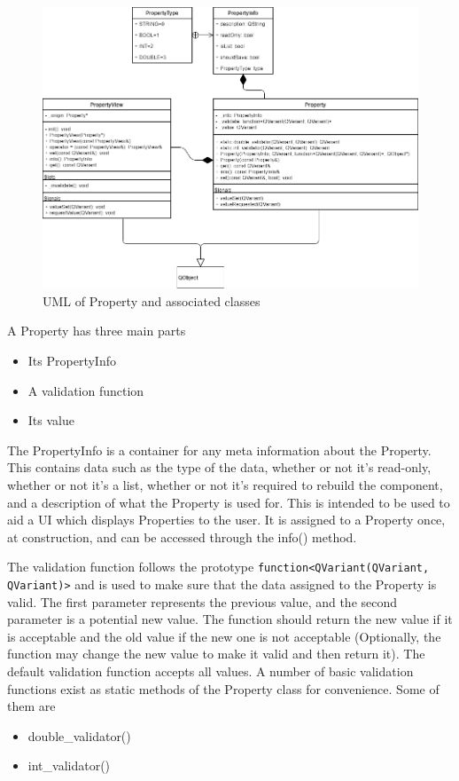  \begin{figure}[h!]
 	\begin{center}
 	\includegraphics[width=\textwidth]{./images_design/uml/Property}
 	\caption{UML of Property and associated classes\label{uml:property}}
 	\end{center}
 \end{figure} 
 
 	A Property has three main parts
 	\begin{itemize}
 		\item Its PropertyInfo
 		\item A validation function
 		\item Its value
 	\end{itemize}
 	
 	The PropertyInfo is a container for any meta information about the Property. This contains data such as the type of the data, whether or not it's read-only, whether or not it's a list, whether or not it's required to rebuild the component, and a description of what the Property is used for. This is intended to be used to aid a UI which displays Properties to the user. It is assigned to a Property once, at construction, and can be accessed through the info() method.
 	
 	The validation function follows the prototype \lstinline|function<QVariant(QVariant, QVariant)>| and is used to make sure that the data assigned to the Property is valid. The first parameter represents the previous value, and the second parameter is a potential new value. The function should return the new value if it is acceptable and the old value if the new one is not acceptable (Optionally, the function may change the new value to make it valid and then return it). The default validation function accepts all values. A number of basic validation functions exist as static methods of the Property class for convenience. Some of them are
 	\begin{itemize}
 		\item double\_validator()
 		\item int\_validator()
 	\end{itemize}
 	
